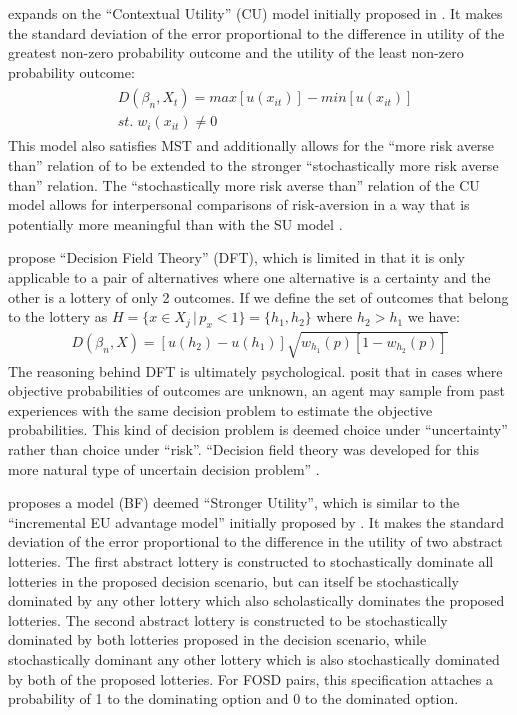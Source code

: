 \documentclass[../main.tex]{subfiles}
\begin{document}
\textcite{Wilcox2011} expands on the \enquote{Contextual Utility} (CU) model initially proposed in \textcite{Wilcox2008}.
It makes the standard deviation of the error proportional to the difference in utility of the greatest non-zero probability outcome and the utility of the least non-zero probability outcome:
\begin{align*}
	\label{eq2:W.cu}
	\begin{split}
		&D(\beta_n,X_t) = \mathit{max}[u(x_{it})] - \mathit{min}[u(x_{it})]\\
		&\mathit{st.}\; w_i(x_{it}) \neq 0
	\end{split}
\end{align*}
This model also satisfies MST and additionally allows for the \enquote{more risk averse than} relation of \textcite{Pratt1964} to be extended to the stronger \enquote{stochastically more risk averse than} relation.
The \enquote{stochastically more risk averse than} relation of the CU model allows for interpersonal comparisons of risk-aversion in a way that is potentially more meaningful than with the SU model \parencite*[221]{Wilcox2008}.

\textcite{Busemeyer1993} propose \enquote{Decision Field Theory} (DFT), which is limited in that it is only applicable to a pair of alternatives where one alternative is a certainty and the other is a lottery of only 2 outcomes.
If we define the set of outcomes that belong to the lottery as $H = \{x \in X_j \,|\, p_x < 1\} = \{h_1,h_2\}$ where $h_2 > h_1$ we have:
\begin{align*}
	D(\beta_n,X) = \left[ u(h_2) - u(h_1) \right] \sqrt{w_{h_1}(p)[1-w_{h_2}(p)]}
\end{align*}
The reasoning behind DFT is ultimately psychological.
\textcite{Busemeyer1993} posit that in cases where objective probabilities of outcomes are unknown, an agent may sample from past experiences with the same decision problem to estimate the objective probabilities.
This kind of decision problem is deemed choice under \enquote{uncertainty} rather than choice under \enquote{risk}.
\enquote{Decision field theory was developed for this more natural type of uncertain decision problem} \parencite*[436]{Busemeyer1993}.

\textcite{Blavatskyy2014} proposes a model (BF) deemed \enquote{Stronger Utility}, which is similar to the \enquote{incremental EU advantage model} initially proposed by \textcite{Fishburn1987}.
It makes the standard deviation of the error proportional to the difference in the utility of two abstract lotteries.
The first abstract lottery is constructed to stochastically dominate all lotteries in the proposed decision scenario, but can itself be stochastically dominated by any other lottery which also scholastically dominates the proposed lotteries.
The second abstract lottery is constructed to be stochastically dominated by both lotteries proposed in the decision scenario, while stochastically dominant any other lottery which is also stochastically dominated by both of the proposed lotteries.
For FOSD pairs, this specification attaches a probability of 1 to the dominating option and 0 to the dominated  option.
\end{document}
